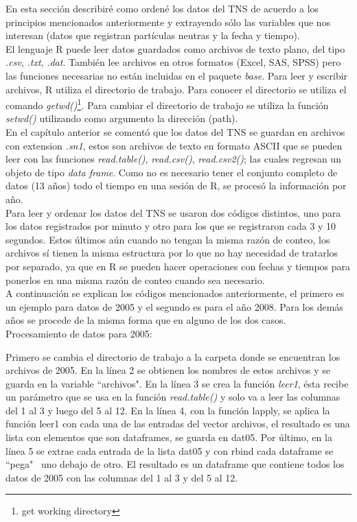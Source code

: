 En esta sección describiré como ordené los datos del TNS de acuerdo a los principios mencionados anteriormente y extrayendo sólo las variables que nos interesan (datos que registran partículas neutras y la fecha y tiempo).\\

El lenguaje R puede leer datos guardados como archivos de texto plano, del tipo \emph{.csv}, \emph{.txt}, \emph{.dat}. También lee archivos en otros formatos (Excel, SAS, SPSS) pero las funciones necesarias no están incluidas en el paquete \emph{base}. Para leer y escribir archivos, R utiliza el directorio de trabajo. Para conocer el directorio se utiliza el comando \emph{getwd()}\footnote{get working directory}. Para cambiar el directorio de trabajo se utiliza la función \emph{setwd()} utilizando como argumento la dirección (path).\\

En el capítulo anterior se comentó que los datos del TNS se guardan en archivos con extension \emph{.sn1}, estos son archivos de texto en formato ASCII que se pueden leer con las funciones \emph{read.table()}, \emph{read.csv()}, \emph{read.csv2()}; las cuales regresan un objeto de tipo \emph{data frame}. Como no es necesario tener el conjunto completo de datos (13 años) todo el tiempo en una sesión de  R, se procesó la información por año.\\ 

Para leer y ordenar los datos del TNS se usaron dos códigos distintos, uno para los datos registrados por minuto y otro para los que se registraron cada 3 y 10 segundos. Estos últimos aún cuando no tengan la misma razón de conteo, los archivos sí tienen la misma estructura por lo que no hay necesidad de tratarlos por separado, ya que en R se pueden hacer operaciones con fechas y tiempos para ponerlos en una misma razón de conteo cuando sea necesario.\\

A continuación se explican los códigos mencionados anteriormente, el primero es un ejemplo para datos de 2005 y el segundo es para el año 2008. Para los demás años se procede de la misma forma que en alguno de los dos casos.\\

Procesamiento de datos para 2005:

Primero se cambia el directorio de trabajo a la carpeta donde se encuentran los archivos de 2005. En la línea 2 se obtienen los nombres de estos archivos y se guarda en la variable ``archivos". En la línea 3 se crea la función \emph{leer1}, ésta recibe un parámetro que se usa en la función \emph{read.table()} y solo va a leer las columnas del 1 al 3 y luego del 5 al 12. En la línea 4, con la función lapply, se aplica la función leer1 con cada una de las entradas del vector archivos, el resultado es una lista con elementos que son dataframes, se guarda en dat05. Por último, en la línea 5 se extrae cada entrada de la lista dat05 y con rbind cada dataframe se ``pega" \, uno debajo de otro. El resultado es un dataframe que contiene todos los datos de 2005 con las columnas del 1 al 3 y del 5 al 12.\\

